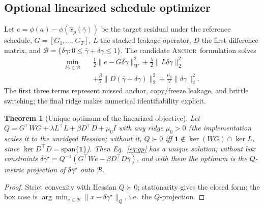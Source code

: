 \documentclass[letterpaper]{article}
\newcommand{\method}{\textsc{Anchor}}
\newtheorem{theorem}{Theorem}
\begin{document}
\subsection{Optional linearized schedule optimizer}
Let $e=\phi(a)-\phi(\hat x_p(\bar\gamma))$ be the target residual under
the reference schedule, $G=[G_1,\ldots,G_T]$, $L$ the stacked leakage
operator, $D$ the first-difference matrix, and
$\mathcal B=\{\delta\gamma: 0\le\bar\gamma+\delta\gamma\le 1\}$. The
candidate \method\ formulation solves
\begin{equation}
\begin{aligned}
\min_{\delta\gamma\in\mathcal B}\quad
&\tfrac12\|e-G\delta\gamma\|_W^2
+\tfrac{\lambda}{2}\|L\delta\gamma\|_2^2\\
&+\tfrac{\beta}{2}\|D(\bar\gamma+\delta\gamma)\|_2^2
+\tfrac{\mu_0}{2}\|\delta\gamma\|_2^2 .
\end{aligned}
\label{eq:qp}
\end{equation}
The first three terms represent missed anchor, copy/freeze leakage, and
brittle switching; the final ridge makes numerical identifiability explicit.
\begin{theorem}[Unique optimum of the linearized objective]\label{thm:qp}
Let $Q=G^\top WG+\lambda L^\top L+\beta D^\top D+\mu_0 I$ with any ridge
$\mu_0>0$ (the implementation scales it to the unridged Hessian; without it,
$Q\succ0$ iff $\mathbf 1\notin\ker(WG)\cap\ker L$, since
$\ker D^\top D=\mathrm{span}\{\mathbf 1\}$). Then Eq.~\eqref{eq:qp} has a
unique solution; without box constraints
$\delta\gamma^{\star}=Q^{-1}(G^\top We-\beta D^\top D\bar\gamma)$, and with
them the optimum is the $Q$-metric projection of $\delta\gamma^\star$ onto
$\mathcal B$.
\end{theorem}
\begin{proof}
Strict convexity with Hessian $Q\succ0$; stationarity gives the closed
form; the box case is
$\arg\min_{x\in\mathcal B}\|x-\delta\gamma^\star\|_Q$, i.e.\ the
$Q$-projection.
\end{proof}
\end{document}
